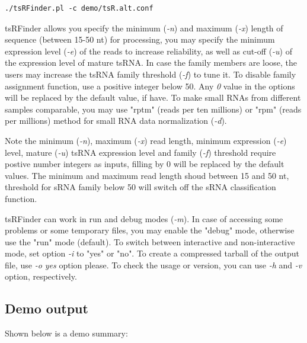 \documentclass[11pt, a4paper]{article}
\begin{document}
{\footnotesize \begin{tcolorbox}[colback=blue!5!white,colframe=pink!75!black,title=Running tsRFinder alternative demo]
\begin{verbatim}
./tsRFinder.pl -c demo/tsR.alt.conf
\end{verbatim}
\end{tcolorbox}}

tsRFinder allows you specify the minimum (\emph{-n}) and maximum (\emph{-x}) length of sequence (between 15-50 nt) for processing, you may specify the minimum expression level (\emph{-e}) of the reads to increase reliability, as well as cut-off (\emph{-u}) of the expression level of mature tsRNA. In case the family members are loose, the users may increase the tsRNA family threshold (\emph{-f}) to tune it. To disable family assignment function, use a positive integer below 50. Any \emph{0} value in the options will be replaced by the default value, if have. To make small RNAs from different samples comparable, you may use "rptm" (reads per ten millions) or "rpm" (reads per millions) method for small RNA data normalization (\emph{-d}).

Note the minimum (\emph{-n}), maximum (\emph{-x}) read length, minimum expression (\emph{-e}) level, mature (\emph{-u}) tsRNA expression level and family (\emph{-f}) threshold require postive number integers as inputs, filling by 0 will be replaced by the default values. The minimum and maximum read length shoud between 15 and 50 nt, threshold for sRNA family below 50 will switch off the sRNA classification function.

tsRFinder can work in run and debug modes (\emph{-m}). In case of accessing some problems or some temporary files, you may enable the "debug" mode, otherwise use the "run" mode (default). To switch between interactive and non-interactive mode, set option \emph{-i} to "yes" or "no". To create a compressed tarball of the output file, use \emph{-o yes} option please. To check the usage or version, you can use \emph{-h} and \emph{-v} option, respectively.

\subsection{Demo output}

Shown below is a demo summary:
\end{document}
